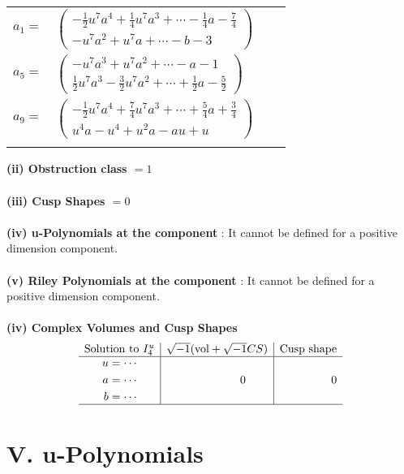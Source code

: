 \documentclass[1p]{elsarticle_modified}
\theoremstyle{definition}
\newcommand{\I}{\sqrt{-1}}
\begin{document}
\begin{tabular}{m{7pt} m{180pt} m{7pt} m{180pt} }
\flushright $a_{1}=$&$\begin{pmatrix}-\frac{1}{2} u^7 a^4+\frac{1}{4} u^7 a^3+\cdots-\frac{1}{4} a-\frac{7}{4}\\- u^7 a^2+u^7 a+\cdots- b-3\end{pmatrix}$ \\
\flushright $a_{5}=$&$\begin{pmatrix}- u^7 a^3+u^7 a^2+\cdots- a-1\\\frac{1}{2} u^7 a^3-\frac{3}{2} u^7 a^2+\cdots+\frac{1}{2} a-\frac{5}{2}\end{pmatrix}$ \\
\flushright $a_{9}=$&$\begin{pmatrix}-\frac{1}{2} u^7 a^4+\frac{7}{4} u^7 a^3+\cdots+\frac{5}{4} a+\frac{3}{4}\\u^4 a- u^4+u^2 a- a u+u\end{pmatrix}$\\&\end{tabular}
\flushleft \textbf{(ii) Obstruction class $= 1$}\\~\\
\flushleft \textbf{(iii) Cusp Shapes $= 0$}\\~\\
\flushleft \textbf{(iv) u-Polynomials at the component} : It cannot be defined for a positive dimension component.\\~\\
\flushleft \textbf{(v) Riley Polynomials at the component} : It cannot be defined for a positive dimension component.\\~\\
\newpage\flushleft \textbf{(iv) Complex Volumes and Cusp Shapes}
$$\begin{array}{c|c|c} 
\text{Solution to }I^u_{4}& \I (\text{vol} + \sqrt{-1}CS) & \text{Cusp shape}\\
 \hline 
\begin{aligned}
u &= \cdots \\
a &= \cdots \\
b &= \cdots\end{aligned}
 & \phantom{-0.000000 } 0 & \phantom{-0.000000 } 0\\
 \hline 
 \end{array}
$$
\newpage\renewcommand{\arraystretch}{1}
\centering \section*{ V. u-Polynomials}
\end{document}
